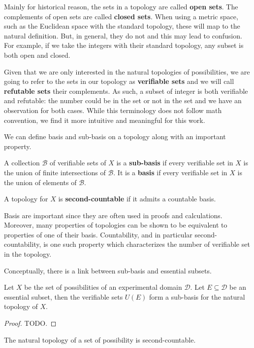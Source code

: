 \documentclass[11pt,letterpaper,fleqn]{memoir} %
\begin{document}
Mainly for historical reason, the sets in a topology are called \textbf{open sets}. The complements of open sets are called \textbf{closed sets}. When using a metric space, such as the Euclidean space with the standard topology, these will map to the natural definition. But, in general, they do not and this may lead to confusion. For example, if we take the integers with their standard topology, any subset is both open and closed.

Given that we are only interested in the natural topologies of possibilities, we are going to refer to the sets in our topology as \textbf{verifiable sets} and we will call \textbf{refutable sets} their complements. As such, a subset of integer is both verifiable and refutable: the number could be in the set or not in the set and we have an observation for both cases.  While this terminology does not follow math convention, we find it more intuitive and meaningful for this work.

We can define basis and sub-basis on a topology along with an important property.
\begin{mathSection}
\begin{defn}
	A collection $\mathcal{B}$ of verifiable sets of $X$ is a \textbf{sub-basis} if every verifiable set in $X$ is the union of finite intersections of $\mathcal{B}$. It is a \textbf{basis} if every verifiable set in $X$ is the union of elements of $\mathcal{B}$.
\end{defn}
\begin{defn}
	A topology for $X$ is \textbf{second-countable} if it admits a countable basis.
\end{defn}
\end{mathSection}

Basis are important since they are often used in proofs and calculations. Moreover, many properties of topologies can be shown to be equivalent to properties of one of their basis. Countability, and in particular second-countability, is one such property which characterizes the number of verifiable set in the topology.

Conceptually, there is a link between sub-basis and essential subsets.

\begin{mathSection}
	\begin{prop}
		Let $X$ be the set of possibilities of an experimental domain $\mathcal{D}$. Let $E \subseteq \mathcal{D}$ be an essential subset, then the verifiable sets $U(E)$ form a sub-basis for the natural topology of $X$.
	\end{prop}
	\begin{proof}
		TODO.
	\end{proof}
	\begin{prop}
	The natural topology of a set of possibility is second-countable.
\end{prop}
\end{mathSection}
\end{document}
